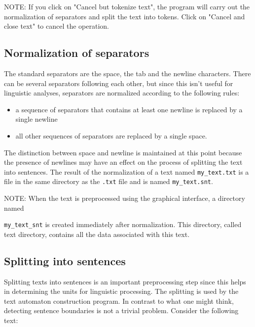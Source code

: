 \bigskip
\noindent NOTE: If you click on "Cancel but tokenize text", the program will
carry out the normalization of separators and split the text into tokens. Click
on "Cancel and close text" to cancel the operation.

\subsection{Normalization of separators}
The standard separators are the space, the tab and the newline characters. There
can be several separators following each other, but since this isn't useful for
linguistic analyses, separators are normalized according to the following rules:

\begin{itemize}
  \item a sequence of separators that contains at least one newline is replaced by a single newline
  
  \item all other sequences of separators are replaced by a single space.
\end{itemize}

\bigskip
\noindent 
The distinction between space and newline is maintained at this point because the
presence of newlines may have an effect on the process of splitting the text into
sentences. The result of the normalization of a text named  \verb+my_text.txt+ is
a file in the same directory as the \verb+.txt+ file and is named
\verb+my_text.snt+. 

\bigskip
\noindent NOTE: When the text is preprocessed using the graphical interface, a
directory named

\noindent \verb+my_text_snt+ is created immediately after normalization.
This directory, called text directory,  
 contains all the data associated with this text.



\subsection{Splitting into sentences}
\label{section-sentence-splitting}
Splitting texts into sentences is an important preprocessing step since  this
helps in determining the units for linguistic processing. The splitting is used
by the text automaton construction program. In contrast to what one might think,
detecting sentence boundaries is not a trivial problem. Consider the following
text:

